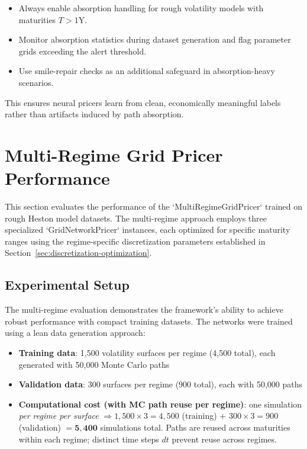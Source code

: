	\begin{itemize}[nosep]
		\item Always enable absorption handling for rough volatility models with maturities $T>1$Y.
		\item Monitor absorption statistics during dataset generation and flag parameter grids exceeding the alert threshold.
		\item Use smile-repair checks as an additional safeguard in absorption-heavy scenarios.
	\end{itemize}
	
	This ensures neural pricers learn from clean, economically meaningful labels rather than artifacts induced by path absorption.
	
	\section{Multi-Regime Grid Pricer Performance}
	\label{sec:multiregime-results}
	
	This section evaluates the performance of the `MultiRegimeGridPricer` trained on rough Heston model datasets. The multi-regime approach employs three specialized `GridNetworkPricer` instances, each optimized for specific maturity ranges using the regime-specific discretization parameters established in Section~\ref{sec:discretization-optimization}.
	
	\subsection{Experimental Setup}
	
	The multi-regime evaluation demonstrates the framework's ability to achieve robust performance with compact training datasets. The networks were trained using a lean data generation approach:
	
	\begin{itemize}[nosep]
		\item \textbf{Training data}: 1{,}500 volatility surfaces per regime (4{,}500 total), each generated with 50{,}000 Monte Carlo paths
		\item \textbf{Validation data}: 300 surfaces per regime (900 total), each with 50{,}000 paths
		\item \textbf{Computational cost (with MC path reuse per regime)}: 
		one simulation \emph{per regime per surface} 
		$\Rightarrow 1{,}500 \times 3 = 4{,}500$ (training) $+$ 
		$300 \times 3 = 900$ (validation) 
		$= \mathbf{5{,}400}$ simulations total. 
		Paths are reused across maturities within each regime; distinct time steps $dt$ prevent reuse across regimes.
	\end{itemize}
	
